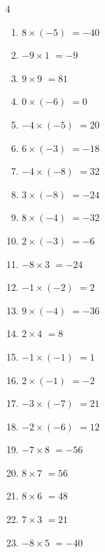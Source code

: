 \begin{multicols}{4}
\begin{enumerate}
  \item $8\times (-5)$
        $=-40$

  \item $-9\times 1$
        $=-9$

  \item $9\times 9$
        $=81$

  \item $0\times (-6)$
        $=0$

  \item $-4\times (-5)$
        $=20$

  \item $6\times (-3)$
        $=-18$

  \item $-4\times (-8)$
        $=32$

  \item $3\times (-8)$
        $=-24$

  \item $8\times (-4)$
        $=-32$

  \item $2\times (-3)$
        $=-6$

  \item $-8\times 3$
        $=-24$

  \item $-1\times (-2)$
        $=2$

  \item $9\times (-4)$
        $=-36$

  \item $2\times 4$
        $=8$

  \item $-1\times (-1)$
        $=1$

  \item $2\times (-1)$
        $=-2$

  \item $-3\times (-7)$
        $=21$

  \item $-2\times (-6)$
        $=12$

  \item $-7\times 8$
        $=-56$

  \item $8\times 7$
        $=56$

  \item $8\times 6$
        $=48$

  \item $7\times 3$
        $=21$

  \item $-8\times 5$
        $=-40$


\end{enumerate}
\end{multicols}
